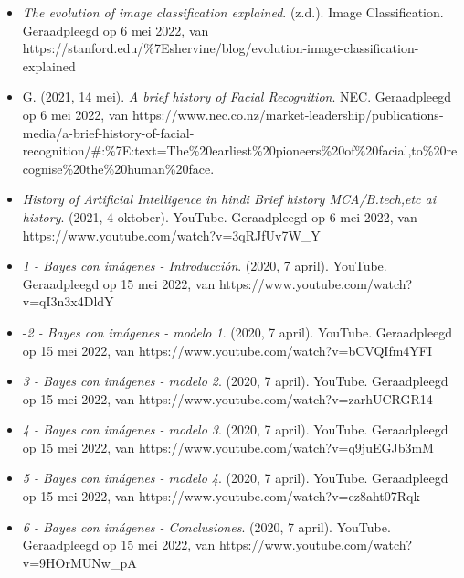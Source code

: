 \documentclass[
  spanish,
]{article}
\providecommand{\tightlist}{%
  \setlength{\itemsep}{0pt}\setlength{\parskip}{0pt}}
\begin{document}
\begin{itemize}
\tightlist
\item
  \emph{The evolution of image classification explained}. (z.d.). Image
  Classification. Geraadpleegd op 6 mei 2022, van
  https://stanford.edu/\%7Eshervine/blog/evolution-image-classification-explained
\item
  G. (2021, 14 mei). \emph{A brief history of Facial Recognition}. NEC.
  Geraadpleegd op 6 mei 2022, van
  https://www.nec.co.nz/market-leadership/publications-media/a-brief-history-of-facial-recognition/\#:\%7E:text=The\%20earliest\%20pioneers\%20of\%20facial,to\%20recognise\%20the\%20human\%20face.
\item
  \emph{History of Artificial Intelligence in hindi \textbar{} Brief
  history \textbar{} MCA/B.tech,etc \textbar{} ai history}. (2021, 4
  oktober). YouTube. Geraadpleegd op 6 mei 2022, van
  https://www.youtube.com/watch?v=3qRJfUv7W\_Y
\item
  \emph{1 - Bayes con imágenes - Introducción}. (2020, 7 april).
  YouTube. Geraadpleegd op 15 mei 2022, van
  https://www.youtube.com/watch?v=qI3n3x4DldY
\item
  -\emph{2 - Bayes con imágenes - modelo 1}. (2020, 7 april). YouTube.
  Geraadpleegd op 15 mei 2022, van
  https://www.youtube.com/watch?v=bCVQIfm4YFI
\item
  \emph{3 - Bayes con imágenes - modelo 2}. (2020, 7 april). YouTube.
  Geraadpleegd op 15 mei 2022, van
  https://www.youtube.com/watch?v=zarhUCRGR14
\item
  \emph{4 - Bayes con imágenes - modelo 3}. (2020, 7 april). YouTube.
  Geraadpleegd op 15 mei 2022, van
  https://www.youtube.com/watch?v=q9juEGJb3mM
\item
  \emph{5 - Bayes con imágenes - modelo 4}. (2020, 7 april). YouTube.
  Geraadpleegd op 15 mei 2022, van
  https://www.youtube.com/watch?v=ez8aht07Rqk
\item
  \emph{6 - Bayes con imágenes - Conclusiones}. (2020, 7 april).
  YouTube. Geraadpleegd op 15 mei 2022, van
  https://www.youtube.com/watch?v=9HOrMUNw\_pA
\end{itemize}
\end{document}
